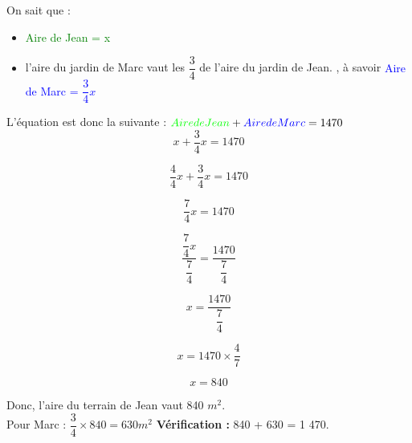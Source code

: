 \documentclass[a4paper,11pt]{article}
\newcommand{\bi}{\begin{itemize}}
\newcommand{\ei}{\end{itemize}}
\begin{document}
On sait que :
\bi
\item \textcolor{green}{Aire de Jean = x}

\item l'aire du jardin de Marc vaut les $\dfrac{3}{4}$ de l'aire du jardin de Jean. , à savoir \textcolor{blue}{Aire de Marc = $\dfrac{3}{4}x$ }

\ei

L'équation est donc la suivante : \hspace*{1cm} $ \textcolor{green}{Aire de Jean } + \textcolor{blue}{Aire de Marc}  = 1 470$\\

$$ x + \dfrac{3}{4}x = 1470$$


$$ \dfrac{4}{4}x + \dfrac{3}{4}x = 1470$$

$$ \dfrac{7}{4}x = 1470$$

$$ \dfrac{\dfrac{7}{4}x}{\dfrac{7}{4}} = \dfrac{1470}{\dfrac{7}{4}}$$


$$x = \dfrac{1470}{\dfrac{7}{4}}$$


$$x =1470 \times \dfrac{4}{7}$$

$$x =840$$

Donc, l'aire du terrain de Jean vaut 840 $m^{2}$.\\

Pour Marc : $\dfrac{3}{4} \times 840 = 630 m^{2}$ \hspace*{1.5cm}\textbf{Vérification :} 840 + 630 = 1 470.\\



\color{black}


 
\end{document}
